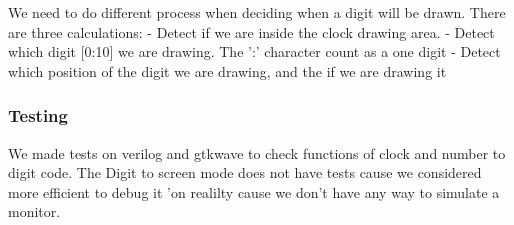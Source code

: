 We need to do different process when deciding when a digit will be drawn. There are three calculations:
- Detect if we are inside the clock drawing area.
- Detect which digit [0:10] we are drawing. The ':' character count as a one digit
- Detect which position of the digit we are drawing, and the if we are drawing it


\subsubsection*{Testing}
We made tests on verilog and gtkwave to check functions of clock and number to digit code. The Digit to screen mode does not have tests cause we considered more efficient to debug it 'on realilty cause we don't have any way to simulate a monitor.





